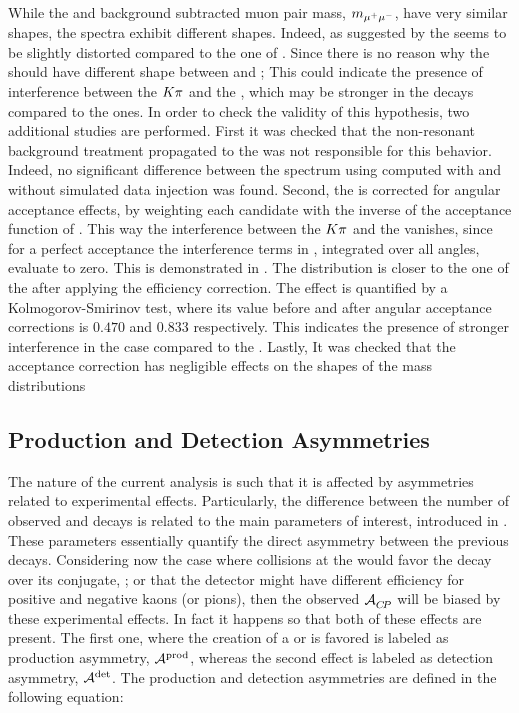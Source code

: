 While the \Bs and \Bd background subtracted muon pair mass, $m_{\mu^+\mu^-}$, have very similar shapes, the \mkpi spectra exhibit different shapes.
Indeed, as suggested by  the \Bs \mkpi \sPlot seems to be slightly distorted compared to the one of \Bd \mkpi.
Since there is no \aprior reason why the \Kstarz \pwave
should have different shape between \BsJpsiKst and \BdJpsiKst; This could indicate the presence of interference between
the $K\pi$ \swave and the \Kstarz, which may be stronger in the \Bs decays compared to the \Bd ones. In order
to check the validity of this hypothesis, two additional studies are performed. First it was checked that the non-resonant
background treatment propagated to the \sWeights was not responsible for this behavior. Indeed, no significant difference
between the \Bs \mkpi spectrum using \sWeights computed with and without simulated data injection was found. Second, the \mkpi
is corrected for angular acceptance effects, by weighting each candidate with the inverse of the acceptance function of .
This way the interference between the $K\pi$ \swave and the \Kstarz \pwave vanishes, since
for a perfect acceptance the interference terms in , integrated over all angles, evaluate to zero.
This is demonstrated in . The \Bs \mkpi distribution is closer to the one of the \Bd after applying
the efficiency correction. The effect is quantified by a Kolmogorov-Smirinov test, where its value before and after
angular acceptance corrections is $0.470$ and $0.833$ respectively. This indicates the presence of
stronger interference in the \Bs case compared to the \Bd. Lastly, It was checked that the acceptance
correction has negligible effects on the shapes of the \jpsi mass distributions

\subsection{Production and Detection Asymmetries}
\label{experimentalAssym}
The nature of the current analysis is such that it is affected by asymmetries related to experimental effects.
Particularly, the difference between the number of observed \BsJpsiKst and \BsbarJpsiKst decays is related to the
main parameters of interest, introduced in . These parameters essentially
quantify the direct \CP asymmetry between the previous decays.
Considering now the case where collisions at the \lhc would favor the \BsJpsiKst decay over its \CP conjugate, \BsbarJpsiKst;
or that the detector might have different efficiency for positive and negative kaons (or pions),
then the observed $\mathcal{A}_{C\!P}^{}$ will be biased by these experimental effects. In fact it happens so that both of these effects
are present. The first one, where the creation of a \Bs or \Bsb is favored is labeled as  production asymmetry, $\mathcal{A}^{\text{prod}}$,
whereas the second effect is labeled as detection asymmetry, $\mathcal{A}^{\text{det}}$. The production and detection
asymmetries are defined in the following equation:

